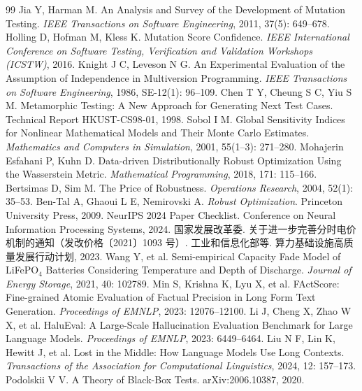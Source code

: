 \documentclass[11pt,a4paper]{article}
\begin{document}
\begin{thebibliography}{99}\footnotesize\setlength{\itemsep}{0pt}\setlength{\parskip}{0pt}
 Jia Y, Harman M. An Analysis and Survey of the Development of Mutation Testing.
  \emph{IEEE Transactions on Software Engineering}, 2011, 37(5): 649--678.
 Holling D, Hofman M, Kless K. Mutation Score Confidence.
  \emph{IEEE International Conference on Software Testing, Verification and Validation Workshops (ICSTW)}, 2016.
 Knight J C, Leveson N G. An Experimental Evaluation of the Assumption of Independence
  in Multiversion Programming. \emph{IEEE Transactions on Software Engineering}, 1986, SE-12(1): 96--109.
 Chen T Y, Cheung S C, Yiu S M. Metamorphic Testing: A New Approach for Generating
  Next Test Cases. Technical Report HKUST-CS98-01, 1998.
 Sobol I M. Global Sensitivity Indices for Nonlinear Mathematical Models and
  Their Monte Carlo Estimates. \emph{Mathematics and Computers in Simulation}, 2001, 55(1--3): 271--280.
 Mohajerin Esfahani P, Kuhn D. Data-driven Distributionally Robust Optimization
  Using the Wasserstein Metric. \emph{Mathematical Programming}, 2018, 171: 115--166.
 Bertsimas D, Sim M. The Price of Robustness. \emph{Operations Research}, 2004, 52(1): 35--53.
 Ben-Tal A, Ghaoui L E, Nemirovski A. \emph{Robust Optimization}.
  Princeton University Press, 2009.
 NeurIPS 2024 Paper Checklist. Conference on Neural Information Processing Systems, 2024.
 国家发展改革委. 关于进一步完善分时电价机制的通知（发改价格〔2021〕1093 号）.
 工业和信息化部等. 算力基础设施高质量发展行动计划, 2023.
 Wang Y, et al. Semi-empirical Capacity Fade Model of LiFePO$_4$ Batteries
  Considering Temperature and Depth of Discharge. \emph{Journal of Energy Storage}, 2021, 40: 102789.
 Min S, Krishna K, Lyu X, et al. FActScore: Fine-grained Atomic Evaluation of Factual Precision in Long Form Text Generation. \emph{Proceedings of EMNLP}, 2023: 12076--12100.
 Li J, Cheng X, Zhao W X, et al. HaluEval: A Large-Scale Hallucination Evaluation Benchmark for Large Language Models. \emph{Proceedings of EMNLP}, 2023: 6449--6464.
 Liu N F, Lin K, Hewitt J, et al. Lost in the Middle: How Language Models Use Long Contexts. \emph{Transactions of the Association for Computational Linguistics}, 2024, 12: 157--173.
 Podolskii V V. A Theory of Black-Box Tests. arXiv:2006.10387, 2020.

\end{thebibliography}
\end{document}
